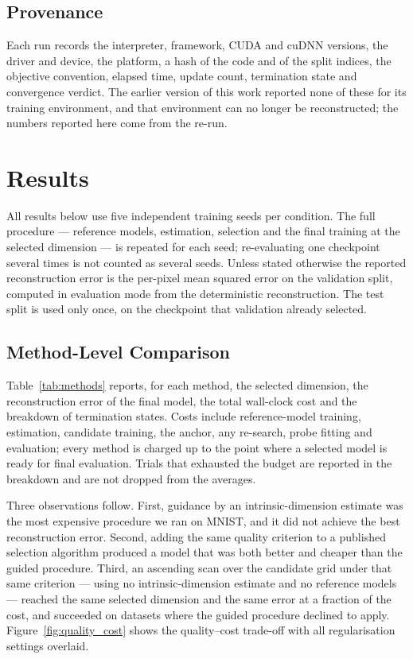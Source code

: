 \documentclass[make,article,submit,pdftex,moreauthors]{Definitions/mdpi}
\begin{document}
\subsection{Provenance}\label{sec:setup_prov}

Each run records the interpreter, framework, CUDA and cuDNN versions, the
driver and device, the platform, a hash of the code and of the split
indices, the objective convention, elapsed time, update count, termination
state and convergence verdict. The earlier version of this work reported
none of these for its training environment, and that environment can no
longer be reconstructed; the numbers reported here come from the re-run.

\section{Results}\label{sec:results}

All results below use five independent training seeds per condition. The
full procedure --- reference models, estimation, selection and the final
training at the selected dimension --- is repeated for each seed;
re-evaluating one checkpoint several times is not counted as several
seeds. Unless stated otherwise the reported reconstruction error is the
per-pixel mean squared error on the validation split, computed in
evaluation mode from the deterministic reconstruction. The test split is
used only once, on the checkpoint that validation already selected.

\subsection{Method-Level Comparison}\label{sec:res_methods}

Table~\ref{tab:methods} reports, for each method, the selected dimension,
the reconstruction error of the final model, the total wall-clock cost and
the breakdown of termination states. Costs include reference-model
training, estimation, candidate training, the anchor, any re-search, probe
fitting and evaluation; every method is charged up to the point where a
selected model is ready for final evaluation. Trials that exhausted the
budget are reported in the breakdown and are not dropped from the
averages.

Three observations follow. First, guidance by an intrinsic-dimension
estimate was the most expensive procedure we ran on MNIST, and it did not
achieve the best reconstruction error. Second, adding the same quality
criterion to a published selection algorithm produced a model that was
both better and cheaper than the guided procedure. Third, an ascending
scan over the candidate grid under that same criterion --- using no
intrinsic-dimension estimate and no reference models --- reached the same
selected dimension and the same error at a fraction of the cost, and
succeeded on datasets where the guided procedure declined to apply.
Figure~\ref{fig:quality_cost} shows the quality--cost trade-off with all
regularisation settings overlaid.
\end{document}
